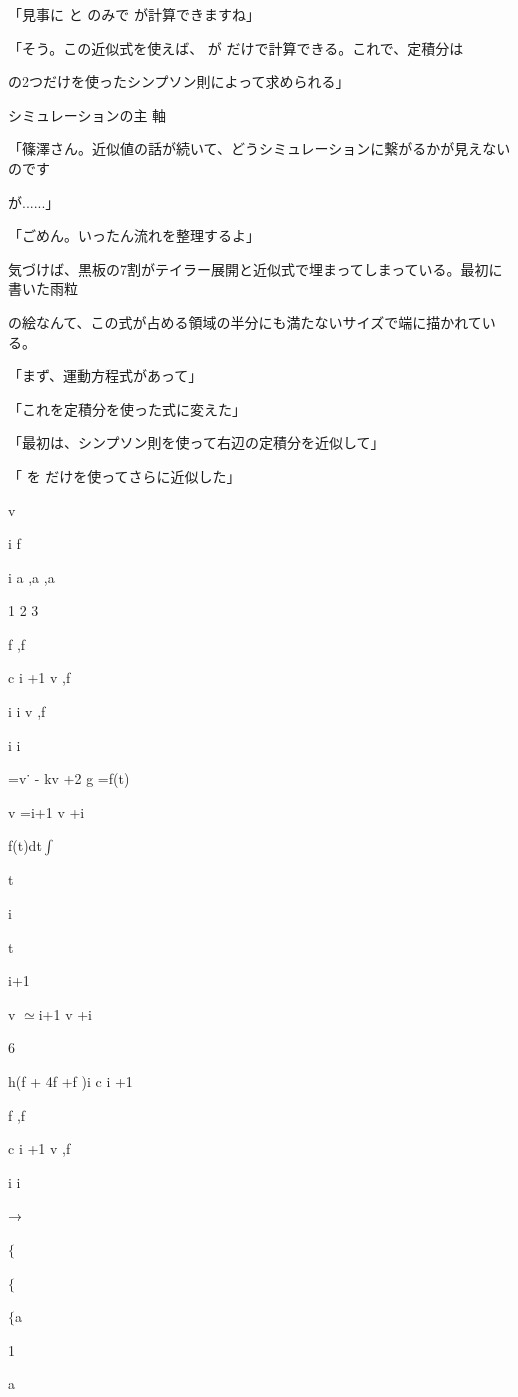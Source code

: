 「⾒事に と のみで が計算できますね」\par
「そう。この近似式を使えば、 が だけで計算できる。これで、定積分は\par
の2つだけを使ったシンプソン則によって求められる」\par
シミュレーションの主 軸\par
「篠澤さん。近似値の話が続いて、どうシミュレーションに繋がるかが⾒えないのです\par
が......」\par
「ごめん。いったん流れを整理するよ」\par
気づけば、黒板の7割がテイラー展開と近似式で埋まってしまっている。最初に書いた⾬粒\par
の絵なんて、この式が占める領域の半分にも満たないサイズで端に描かれている。\par
「まず、運動⽅程式があって」\par
「これを定積分を使った式に変えた」\par
「最初は、シンプソン則を使って右辺の定積分を近似して」\par
「 を だけを使ってさらに近似した」\par
v\par
i f\par
i a  ,a  ,a\par
1 2 3\par
f  ,f\par
c i +1 v  ,f\par
i i v  ,f\par
i i\par
=v˙ - kv +2 g =f(t)\par
v  =i+1 v +i\par
f(t)dt$\int$\par
t\par
i\par
t\par
i+1\par
v  $\simeq$i+1 v  +i\par
6\par
h(f  + 4f  +f  )i c i +1\par
f  ,f\par
c i +1 v  ,f\par
i i\par
→\par
$\{$\par
$\{$\par
$\{$a\par
1\par
a\par
